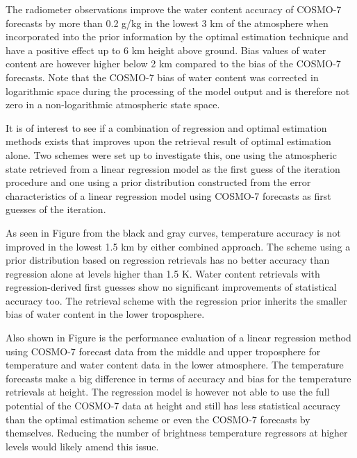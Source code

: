     The radiometer observations improve the water content accuracy of COSMO-7
    forecasts by more than 0.2 g/kg in the lowest 3 km of the atmosphere when
    incorporated into the prior information by the optimal estimation technique
    and have a positive effect up to 6 km height above ground. Bias values of
    water content are however higher below 2 km compared to the bias of the
    COSMO-7 forecasts. Note that the COSMO-7 bias of water content was
    corrected in logarithmic space during the processing of the model output
    and is therefore not zero in a non-logarithmic atmospheric state space.

\stopsubsection

\startsubsection[title={Combined Approaches}]

    It is of interest to see if a combination of regression and optimal
    estimation methods exists that improves upon the retrieval result of
    optimal estimation alone. Two schemes were set up to investigate this,
    one using the atmospheric state retrieved from a linear regression model
    as the first guess of the iteration procedure and one using a prior
    distribution constructed from the error characteristics of a linear
    regression model using COSMO-7 forecasts as first guesses of the iteration.

    As seen in Figure  from the black and gray curves,
    temperature accuracy is not improved in the lowest 1.5 km by either
    combined approach. The scheme using a prior distribution based on
    regression retrievals has no better accuracy than regression alone at
    levels higher than 1.5 K. Water content retrievals with regression-derived
    first guesses show no significant improvements of statistical accuracy too.
    The retrieval scheme with the regression prior inherits the smaller
    bias of water content in the lower troposphere.

    Also shown in Figure  is the performance evaluation of
    a linear regression method using COSMO-7 forecast data from the middle and
    upper troposphere for temperature and water content data in the lower
    atmosphere. The temperature forecasts make a big difference in terms of
    accuracy and bias for the temperature retrievals at height. The regression model
    is however not able to use the full potential of the COSMO-7 data at
    height and still has less statistical accuracy than the optimal estimation
    scheme or even the COSMO-7 forecasts by themselves. Reducing the number of
    brightness temperature regressors at higher levels would likely amend this
    issue.

